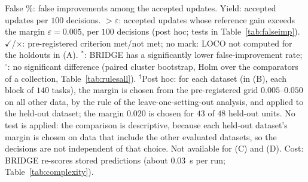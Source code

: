 \begin{table}[!t]
\vspace{2pt}
\parbox{\textwidth}{\justifying\scriptsize False \%: false improvements among the accepted updates. Yield: accepted updates per $100$ decisions. ${>}\varepsilon$: accepted updates whose reference gain exceeds the margin $\varepsilon=0.005$, per $100$ decisions (post hoc; tests in Table~\ref{tab:falseimp}). $\checkmark$/$\times$: pre-registered criterion met/not met; no mark: LOCO not computed for the holdouts in (A). $^{*}$: BRIDGE has a significantly lower false-improvement rate; $^{\circ}$: no significant difference (paired cluster bootstrap, Holm over the comparators of a collection, Table~\ref{tab:rulesall}). $^{\dagger}$Post hoc: for each dataset (in (B), each block of $140$ tasks), the margin is chosen from the pre-registered grid $0.005$--$0.050$ on all other data, by the rule of the leave-one-setting-out analysis, and applied to the held-out dataset; the margin $0.020$ is chosen for $43$ of $48$ held-out units. No test is applied: the comparison is descriptive, because each held-out dataset's margin is chosen on data that include the other evaluated datasets, so the decisions are not independent of that choice. Not available for (C) and (D). Cost: BRIDGE re-scores stored predictions (about $0.03$~s per run; Table~\ref{tab:complexity}).}
\end{table}
